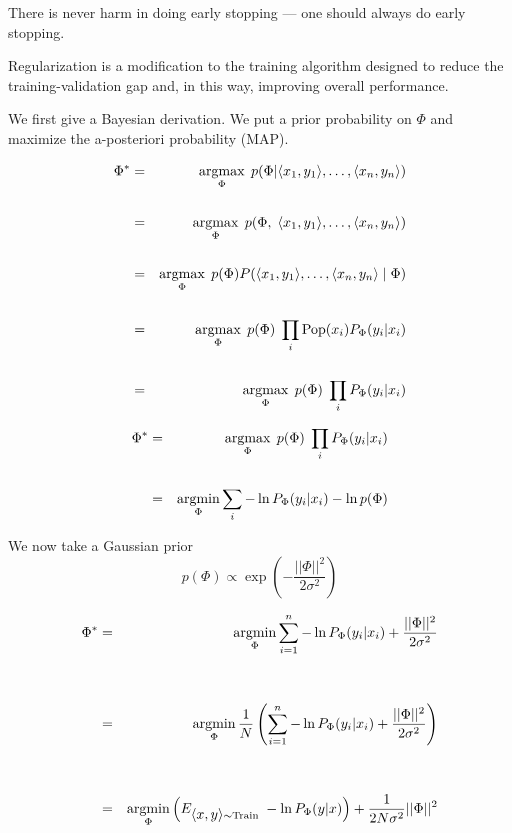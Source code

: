 {

There is never harm in doing early stopping --- one should always do early stopping.

\vfill
Regularization is a modification to the training algorithm designed to reduce the training-validation gap and, in this way, improving overall performance.


We first give a Bayesian derivation. We put a prior probability on $\Phi$ and maximize the a-posteriori probability (MAP).

\vfill
{\huge
\begin{eqnarray*}
\Phi^* & = & \operatorname*{argmax}_\Phi\;p(\Phi | {\mbox{$\langle x_1,y_1\rangle$}},\ldots,{\mbox{$\langle x_n,y_n\rangle$}}) \\
\\
 & = & \operatorname*{argmax}_\Phi\;p(\Phi,\;{\mbox{$\langle x_1,y_1\rangle$}},\ldots,{\mbox{$\langle x_n,y_n\rangle$}}) \\
 \\
  & = & \operatorname*{argmax}_\Phi\;p(\Phi)P({\mbox{$\langle x_1,y_1\rangle$}},\ldots,{\mbox{$\langle x_n,y_n\rangle$}}\;|\;\Phi) \\
 \\
 & = & \operatorname*{argmax}_\Phi \; p(\Phi)\;\prod_i \mathrm{Pop}(x_i)P_\Phi(y_i|x_i) \\
 \\
  & = & \operatorname*{argmax}_\Phi \; p(\Phi)\;\prod_i P_\Phi(y_i|x_i)
 \end{eqnarray*}
}


\begin{eqnarray*}
\Phi^*   & = & \operatorname*{argmax}_\Phi \; p(\Phi)\;\prod_i P_\Phi(y_i|x_i) \\
\\
& = & \operatorname*{argmin}_\Phi \sum_i - \ln P_\Phi(y_i|x_i) -\ln  p(\Phi)
\end{eqnarray*}

\vfill
We now take a Gaussian prior {\color{red} $$p(\Phi) \propto \exp\left(-\frac{||\Phi||^2}{2\sigma^2}\right)$$}


\begin{eqnarray*}
\Phi^* & = & \operatorname*{argmin}_\Phi \sum_{i = 1}^n - \ln P_\Phi(y_i|x_i) + \frac{||\Phi||^2}{2\sigma^2}  \\
\\
\\
& = & \operatorname*{argmin}_\Phi \frac{1}{N} \left(\sum_{i = 1}^n - \ln P_\Phi(y_i|x_i) + \frac{||\Phi||^2}{2\sigma^2}\right)  \\
\\
\\
& = & \operatorname*{argmin}_\Phi \left(E_{{\mbox{$\langle x,y\rangle$}}\sim \mathrm{Train}}\;-\ln P_\Phi(y|x)\right) + \frac{1}{2N\sigma^2} ||\Phi||^2
\end{eqnarray*}

}
